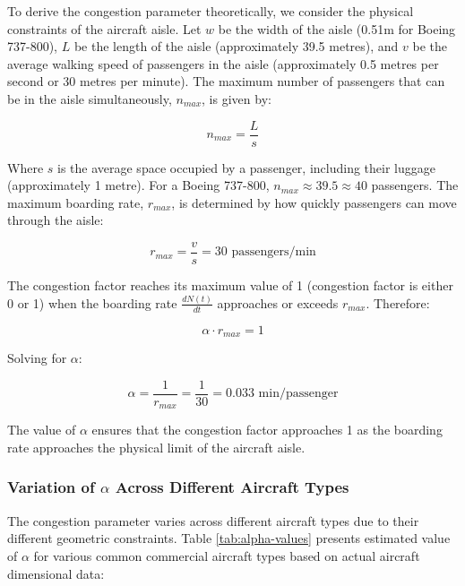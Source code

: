 \documentclass[12pt]{article}
\begin{document}
To derive the congestion parameter theoretically, we consider the physical constraints of the aircraft aisle. Let $w$ be the width of the aisle (0.51m for Boeing 737-800), $L$ be the length of the aisle (approximately 39.5 metres), and $v$ be the average walking speed of passengers in the aisle (approximately 0.5 metres per second or 30 metres per minute). The maximum number of passengers that can be in the aisle simultaneously, $n_{max}$, is given by:

\begin{equation}
n_{max} = \frac{L}{s}
\end{equation}

Where $s$ is the average space occupied by a passenger, including their luggage (approximately 1 metre). For a Boeing 737-800, $n_{max} \approx 39.5 \approx 40$ passengers. The maximum boarding rate, $r_{max}$, is determined by how quickly passengers can move through the aisle:

\begin{equation}
r_{max} = \frac{v}{s} = 30 \text{ passengers/min}
\end{equation}

The congestion factor reaches its maximum value of 1 (congestion factor is either 0 or 1) when the boarding rate $\frac{dN(t)}{dt}$ approaches or exceeds $r_{max}$. Therefore:

\begin{equation}
\alpha \cdot r_{max} = 1
\end{equation}

Solving for $\alpha$:

\begin{equation}
\alpha = \frac{1}{r_{max}} = \frac{1}{30} = 0.033 \text{ min/passenger}
\end{equation}

The value of $\alpha$ ensures that the congestion factor approaches 1 as the boarding rate approaches the physical limit of the aircraft aisle.

\subsubsection{Variation of $\alpha$ Across Different Aircraft Types}

The congestion parameter varies across different aircraft types due to their different geometric constraints. Table \ref{tab:alpha-values} presents estimated value of $\alpha$ for various common commercial aircraft types based on actual aircraft dimensional data:
\end{document}
